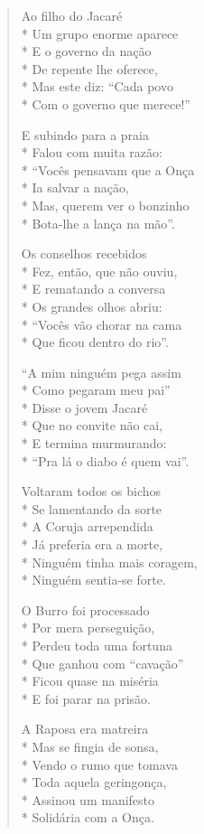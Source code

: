 \begin{verse}
Ao filho do Jacaré\\*
Um grupo enorme aparece\\*
E o governo da nação\\*
De repente lhe oferece,\\*
Mas este diz: “Cada povo\\*
Com o governo que merece!”

E subindo para a praia\\*
Falou com muita razão:\\*
“Vocês pensavam que a Onça\\*
Ia salvar a nação,\\*
Mas, querem ver o bonzinho\\*
Bota-lhe a lança na mão”.

Os conselhos recebidos\\*
Fez, então, que não ouviu,\\*
E rematando a conversa\\*
Os grandes olhos abriu:\\*
“Vocês vão chorar na cama\\*
Que ficou dentro do rio”.

“A mim ninguém pega assim\\*
Como pegaram meu pai”\\*
Disse o jovem Jacaré\\*
Que no convite não cai,\\*
E termina murmurando:\\*
“Pra lá o diabo é quem vai”.

Voltaram todos os bichos\\*
Se lamentando da sorte\\*
A Coruja arrependida\\*
Já preferia era a morte,\\*
Ninguém tinha mais coragem,\\*
Ninguém sentia-se forte.

O Burro foi processado\\*
Por mera perseguição,\\*
Perdeu toda uma fortuna\\*
Que ganhou com “cavação”\\*
Ficou quase na miséria\\*
E foi parar na prisão.

A Raposa era matreira\\*
Mas se fingia de sonsa,\\*
Vendo o rumo que tomava\\*
Toda aquela geringonça,\\*
Assinou um manifesto\\*
Solidária com a Onça.


\end{verse}
